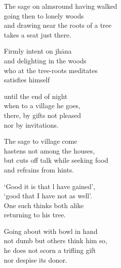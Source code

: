 \begin{MyDescription}{}
The sage on almsround having walked\\
going then to lonely woods\\
and drawing near the roots of a tree\\
takes a seat just there.
\end{MyDescription} 


\begin{MyDescription}{}
Firmly intent on jh\=ana\\
and delighting in the woods\\
who at the tree-roots meditates\\
satisfies himself
\end{MyDescription} 


\begin{MyDescription}{}
until the end of night\\
when to a village he goes,\\
there, by gifts not pleased\\
nor by invitations.
\end{MyDescription} 


\begin{MyDescription}{}
The sage to village come\\
hastens not among the houses,\\
but cuts off talk while seeking food\\
and refrains from hints.
\end{MyDescription} 


\begin{MyDescription}{}
`Good it is that l have gained',\\
`good that I have not as well'.\\
 One such thinks both alike\\
 returning to his tree.
\end{MyDescription} 

\begin{MyDescription}{}
Going about with bowl in hand\\
not dumb but others think him so,\\
he does not scorn a trifling gift\\
nor despise its donor.
\end{MyDescription} 

